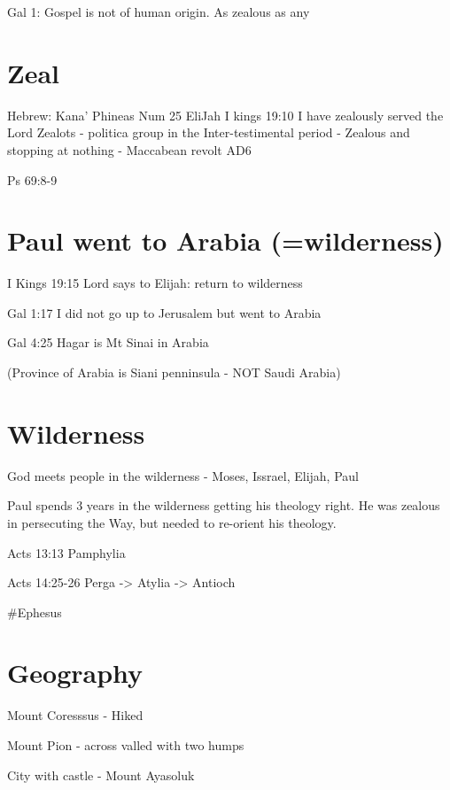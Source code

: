 \documentclass[
]{book}
\begin{document}
Gal 1: Gospel is not of human origin. As zealous as any

\hypertarget{zeal}{%
\section{Zeal}\label{zeal}}

Hebrew: Kana'
Phineas
Num 25
EliJah
I kings 19:10 I have zealously served the Lord
Zealots - politica group in the Inter-testimental period
- Zealous and stopping at nothing
- Maccabean revolt AD6

Ps 69:8-9

\hypertarget{paul-went-to-arabia-wilderness}{%
\section{Paul went to Arabia (=wilderness)}\label{paul-went-to-arabia-wilderness}}

I Kings 19:15 Lord says to Elijah: return to wilderness

Gal 1:17 I did not go up to Jerusalem but went to Arabia

Gal 4:25 Hagar is Mt Sinai in Arabia

(Province of Arabia is Siani penninsula - NOT Saudi Arabia)

\hypertarget{wilderness}{%
\section{Wilderness}\label{wilderness}}

God meets people in the wilderness - Moses, Issrael, Elijah, Paul

Paul spends 3 years in the wilderness getting his theology right. He was zealous in persecuting the Way, but needed to re-orient his theology.

Acts 13:13 Pamphylia

Acts 14:25-26 Perga -\textgreater{} Atylia -\textgreater{} Antioch

\#Ephesus

\hypertarget{geography}{%
\section{Geography}\label{geography}}

Mount Coresssus - Hiked

Mount Pion - across valled with two humps

City with castle - Mount Ayasoluk
\end{document}
